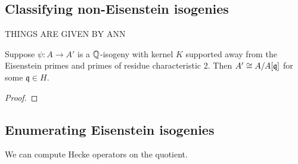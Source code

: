 \documentclass{article}
\begin{document}
\subsection{Classifying non-Eisenstein isogenies}


\begin{theorem}
    THINGS ARE GIVEN BY ANN
\end{theorem}

\begin{theorem}[Calegari, F.]
    Suppose $\psi:A\to A'$ is a $\mathbb{Q}$-isogeny with kernel $K$ supported away
    from the Eisenstein primes and primes of residue characteristic 2. Then
    $A'\cong A/A[\mathfrak{q}]$ for some $\mathfrak{q}\in H$.
\end{theorem}
\begin{proof}
    
\end{proof}

\subsection{Enumerating Eisenstein isogenies}

We can compute Hecke operators on the quotient.


\end{document}

